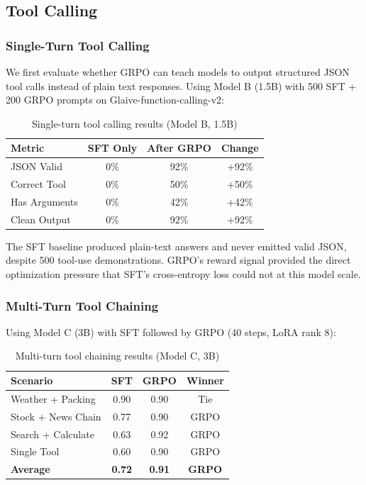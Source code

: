 \documentclass{article}
\begin{document}
\subsection{Tool Calling}

\subsubsection{Single-Turn Tool Calling}

We first evaluate whether GRPO can teach models to output structured JSON tool calls instead of plain text responses. Using Model B (1.5B) with 500 SFT + 200 GRPO prompts on Glaive-function-calling-v2:

\begin{table}[htbp]
    \centering
    \caption{Single-turn tool calling results (Model B, 1.5B)}
    \begin{tabular}{lccc}
        \toprule
        Metric & SFT Only & After GRPO & Change \\
        \midrule
        JSON Valid & 0\% & 92\% & +92\% \\
        Correct Tool & 0\% & 50\% & +50\% \\
        Has Arguments & 0\% & 42\% & +42\% \\
        Clean Output & 0\% & 92\% & +92\% \\
        \bottomrule
    \end{tabular}
    \label{tab:single_turn}
\end{table}

The SFT baseline produced plain-text answers and never emitted valid JSON, despite 500 tool-use demonstrations. GRPO's reward signal provided the direct optimization pressure that SFT's cross-entropy loss could not at this model scale.

\subsubsection{Multi-Turn Tool Chaining}

Using Model C (3B) with SFT followed by GRPO (40 steps, LoRA rank 8):

\begin{table}[htbp]
    \centering
    \caption{Multi-turn tool chaining results (Model C, 3B)}
    \begin{tabular}{lccc}
        \toprule
        Scenario & SFT & GRPO & Winner \\
        \midrule
        Weather + Packing & 0.90 & 0.90 & Tie \\
        Stock + News Chain & 0.77 & 0.90 & GRPO \\
        Search + Calculate & 0.63 & 0.92 & GRPO \\
        Single Tool & 0.60 & 0.90 & GRPO \\
        \textbf{Average} & \textbf{0.72} & \textbf{0.91} & \textbf{GRPO} \\
        \bottomrule
    \end{tabular}
    \label{tab:multi_turn}
\end{table}
\end{document}
